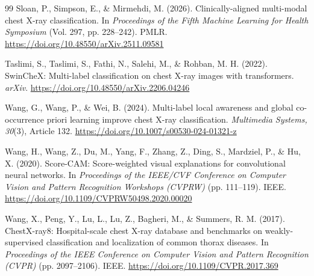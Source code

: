 \documentclass[conference]{IEEEtran}
\begin{document}
\begin{thebibliography}{99}
Sloan, P., Simpson, E., \& Mirmehdi, M. (2026).
Clinically-aligned multi-modal chest X-ray classification.
In \textit{Proceedings of the Fifth Machine Learning for Health Symposium} (Vol. 297, pp. 228--242). PMLR.
\url{https://doi.org/10.48550/arXiv.2511.09581}

Taslimi, S., Taslimi, S., Fathi, N., Salehi, M., \& Rohban, M. H. (2022).
SwinCheX: Multi-label classification on chest X-ray images with transformers.
\textit{arXiv}. \url{https://doi.org/10.48550/arXiv.2206.04246}

Wang, G., Wang, P., \& Wei, B. (2024).
Multi-label local awareness and global co-occurrence priori learning improve chest X-ray classification.
\textit{Multimedia Systems, 30}(3), Article 132.
\url{https://doi.org/10.1007/s00530-024-01321-z}

Wang, H., Wang, Z., Du, M., Yang, F., Zhang, Z., Ding, S., Mardziel, P., \& Hu, X. (2020).
Score-CAM: Score-weighted visual explanations for convolutional neural networks.
In \textit{Proceedings of the IEEE/CVF Conference on Computer Vision and Pattern Recognition Workshops (CVPRW)} (pp. 111--119). IEEE.
\url{https://doi.org/10.1109/CVPRW50498.2020.00020}

Wang, X., Peng, Y., Lu, L., Lu, Z., Bagheri, M., \& Summers, R. M. (2017).
ChestX-ray8: Hospital-scale chest X-ray database and benchmarks on weakly-supervised classification and localization of common thorax diseases.
In \textit{Proceedings of the IEEE Conference on Computer Vision and Pattern Recognition (CVPR)} (pp. 2097--2106). IEEE.
\url{https://doi.org/10.1109/CVPR.2017.369}

\end{thebibliography}
\end{document}
